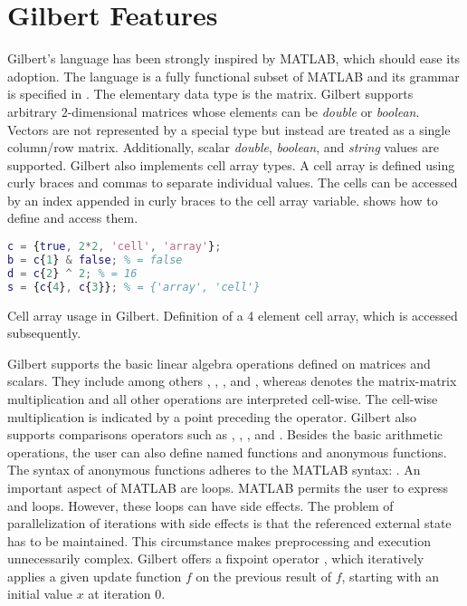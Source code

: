 \section{Gilbert Features}
\label{sec:gilbertFeatures}

Gilbert's language has been strongly inspired by MATLAB, which should ease its adoption.
The language is a fully functional subset of MATLAB and its grammar is specified in \cite{Rohrmann2014}.
The elementary data type is the matrix. Gilbert supports arbitrary $2$-dimensional matrices whose elements can be \emph{double} or \emph{boolean}.
Vectors are not represented by a special type but instead are treated as a single column/row matrix.
Additionally, scalar \emph{double}, \emph{boolean}, and \emph{string} values are supported. Gilbert also implements cell array types.
A cell array is defined using curly braces and commas to separate individual values. The cells can be accessed by an index appended in curly braces to the cell array variable.  shows how to define and access them.

\begin{listing}[!h]
  \begin{CenteredBox}
    \begin{lstlisting}[language=Matlab,
        commentstyle=\color{black},
        stringstyle=\color{black},
    ]
c = {true, 2*2, 'cell', 'array'};
b = c{1} & false; % = false
d = c{2} ^ 2; % = 16
s = {c{4}, c{3}}; % = {'array', 'cell'} 
    \end{lstlisting}
  \end{CenteredBox}
  \caption{Cell array usage in Gilbert. Definition of a 4 element cell array, which is accessed subsequently.}
  \label{lst:cellArray}
\end{listing}

Gilbert supports the basic linear algebra operations defined on matrices and scalars. They include among others \code{+}, \code{-}, \code{/}, and \code{*}, whereas \code{*} denotes the matrix-matrix multiplication and all other operations are interpreted cell-wise. The cell-wise multiplication is indicated by a point preceding the operator. Gilbert also supports comparisons operators such as \code{>}, \code{>=}, \code{==}, and \code{\textasciitilde=}. Besides the basic arithmetic operations, the user can also define named functions and anonymous functions. The syntax of anonymous functions adheres to the MATLAB syntax: . An important aspect of MATLAB are loops. MATLAB permits the user to express  and  loops. However, these loops can have side effects. The problem of parallelization of iterations with side effects is that the referenced external state has to be maintained. This circumstance makes preprocessing and execution unnecessarily complex. Gilbert offers a fixpoint operator , which iteratively applies a given update function $f$ on the previous result of $f$, starting with an initial value $x$ at iteration $0$.

